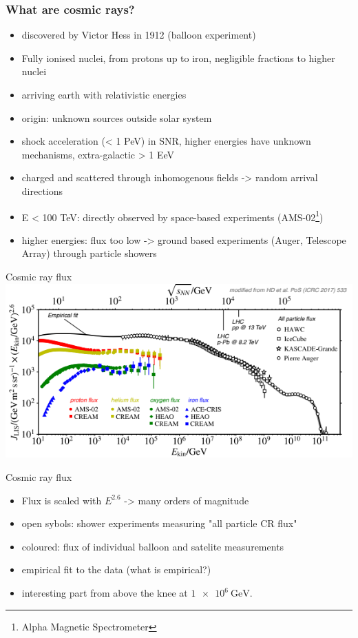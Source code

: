 \documentclass[aspectratio=1610, 9pt]{beamer}
\begin{document}
\begin{frame}\frametitle{What are cosmic rays?}
  \begin{itemize}
    \item discovered by Victor Hess in 1912 (balloon experiment)
    \item Fully ionised nuclei, from protons up to iron, negligible fractions
    to higher nuclei
    \item arriving earth with relativistic energies
    \item origin: unknown sources outside solar system
    \item shock acceleration (< 1 PeV) in SNR, higher energies have unknown
    mechanisms, extra-galactic > 1 EeV
    \item charged and scattered through inhomogenous fields -> random arrival directions
    \item E < 100 TeV: directly observed by space-based experiments (AMS-02\footnote{Alpha Magnetic Spectrometer})
    \item higher energies: flux too low -> ground based experiments
    (Auger, Telescope Array) through particle showers
  \end{itemize}
\end{frame}

\begin{frame}{Cosmic ray flux}
  \includegraphics[width=\textwidth]{knee_heel.png}
\end{frame}

\begin{frame}{Cosmic ray flux}
  \begin{itemize}
    \item Flux is scaled with $E^{2.6}$ -> many orders of magnitude
    \item open sybols: shower experiments measuring "all particle CR flux"
    \item coloured: flux of individual balloon and satelite measurements
    \item empirical fit to the data (what is empirical?)
    \item interesting part from above the knee at $\SI{1e6}{\giga\electronvolt}$.
  \end{itemize}
\end{frame}
\end{document}
